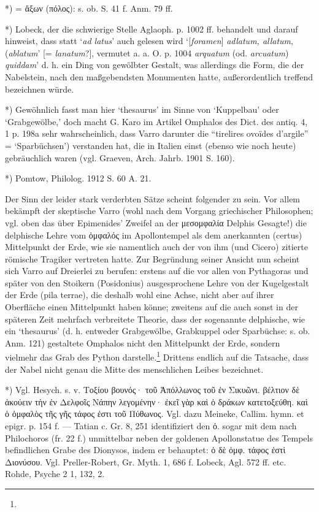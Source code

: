 \documentclass[a4paper, 11pt, oneside]{article}
\begin{document}
*) = ἄξων (πόλος): s. ob. S. 41 f. Anm. 79 ff.

*) Lobeck, der die schwierige Stelle Aglaoph. p. 1002 ff. behandelt und darauf hinweist, dass statt `\emph{ad latus}' auch gelesen wird `[\emph{foramen}] \emph{adlatum, allatum}, (\emph{ablatum}' [= \emph{lanatum}?], vermutet a. a. O. p. 1004 \emph{arquatum} (od. \emph{arcuatum}) \emph{quiddam}' d. h. ein Ding von gewölbter Gestalt, was allerdings die Form, die der Nabelstein, nach den maßgebendsten Monumenten hatte, außerordentlich treffend bezeichnen würde.

*) Gewöhnlich fasst man hier `thesaurus' im Sinne von `Kuppelbau' oder `Grabgewölbe,' doch macht G. Karo im Artikel Omphalos des Dict. des antiq. 4, 1 p. 198a sehr wahrscheinlich, dass Varro darunter die "`tirelires ovoïdes d'argile"' = `Sparbüchsen') verstanden hat, die in Italien einst (ebenso wie noch heute) gebräuchlich waren (vgl. Graeven, Arch. Jahrb. 1901 S. 160).

*) Pomtow, Philolog. 1912 S. 60 A. 21.

Der Sinn der leider stark verderbten Sätze scheint folgender zu sein. Vor allem bekämpft der skeptische Varro (wohl nach dem Vorgang griechischer Philosophen; vgl. oben das über Epimenides' Zweifel an der μεσομφαλία Delphis Gesagte!) die delphische Lehre vom ὀμφαλός im Apollontempel als dem anerkannten (certus) Mittelpunkt der Erde, wie sie namentlich auch der von ihm (und Cicero) zitierte römische Tragiker vertreten hatte. Zur Begründung seiner Ansicht nun scheint sich Varro auf Dreierlei zu berufen: erstens auf die vor allen von Pythagoras und später von den Stoikern (Posidonius) ausgesprochene Lehre von der Kugelgestalt der Erde (pila terrae), die deshalb wohl eine Achse, nicht aber auf ihrer Oberfläche einen Mittelpunkt haben könne; zweitens auf die auch sonst in der späteren Zeit mehrfach verbreitete Theorie, dass der sogenannte delphische, wie ein `thesaurus' (d. h. entweder Grabgewölbe, Grabkuppel oder Sparbüchse: s. ob. Anm. 121) gestaltete Omphalos nicht den Mittelpunkt der Erde, sondern vielmehr das Grab des Python darstelle.\footnote{} Drittens endlich auf die Tatsache, dass der Nabel nicht genau die Mitte des menschlichen Leibes bezeichnet.

*) Vgl. Hesych. s. v. Τοξίου βουνός· τοῦ Ἀπόλλωνος τοῦ ἐν Σικυῶνι. βέλτιον δὲ ἀκούειν τὴν ἐν Δελφοῖς Νάπην λεγομένην· ἐκεῖ γὰρ καὶ ὁ δράκων κατετοξεύθη. καὶ ὁ ὀμφαλὸς τῆς γῆς τάφος ἐστι τοῦ Πύθωνος. Vgl. dazu Meineke, Callim. hymn. et epigr. p. 154 f. --- Tatian c. Gr. 8, 251 identifiziert den ὀ. sogar mit dem nach Philochoros (fr. 22 f.) unmittelbar neben der goldenen Apollonstatue des Tempels befindlichen Grabe des Dionysos, indem er behauptet: ὁ δὲ ὀμφ. τάφος ἐστὶ Διονύσου. Vgl. Preller-Robert, Gr. Myth. 1, 686 f. Lobeck, Agl. 572 ff. etc. Rohde, Psyche 2 1, 132, 2.
\end{document}
